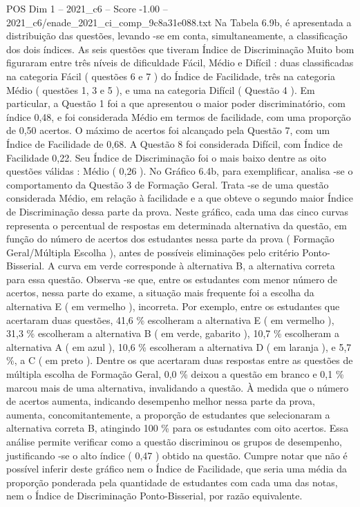 \begin{textsample}{POS Dim 1 – 2021\_c6 – Score -1.00 – 2021\_c6/enade\_2021\_ci\_comp\_9c8a31e088.txt}
Na Tabela 6.9b, é apresentada a distribuição das questões, levando -se em conta, simultaneamente, a classificação dos dois índices.
As seis questões que tiveram Índice de Discriminação Muito bom figuraram entre três níveis de dificuldade Fácil, Médio e Difícil : duas classificadas na categoria Fácil ( questões 6 e 7 ) do Índice de Facilidade, três na categoria Médio ( questões 1, 3 e 5 ), e uma na categoria Difícil ( Questão 4 ).
Em particular, a Questão 1 foi a que apresentou o maior poder discriminatório, com índice 0,48, e foi considerada Médio em termos de facilidade, com uma proporção de 0,50 acertos.
O máximo de acertos foi alcançado pela Questão 7, com um Índice de Facilidade de 0,68.
A Questão 8 foi considerada Difícil, com Índice de Facilidade 0,22.
Seu Índice de Discriminação foi o mais baixo dentre as oito questões válidas : Médio ( 0,26 ).
No Gráfico 6.4b, para exemplificar, analisa -se o comportamento da Questão 3 de Formação Geral.
Trata -se de uma questão considerada Médio, em relação à facilidade e a que obteve o segundo maior Índice de Discriminação dessa parte da prova.
Neste gráfico, cada uma das cinco curvas representa o percentual de respostas em determinada alternativa da questão, em função do número de acertos dos estudantes nessa parte da prova ( Formação Geral/Múltipla Escolha ), antes de possíveis eliminações pelo critério Ponto-Bisserial.
A curva em verde corresponde à alternativa B, a alternativa correta para essa questão.
Observa -se que, entre os estudantes com menor número de acertos, nessa parte do exame, a situação mais frequente foi a escolha da alternativa E ( em vermelho ), incorreta.
Por exemplo, entre os estudantes que acertaram duas questões, 41,6 \% escolheram a alternativa E ( em vermelho ), 31,3 \% escolheram a alternativa B ( em verde, gabarito ), 10,7 \% escolheram a alternativa A ( em azul ), 10,6 \% escolheram a alternativa D ( em laranja ), e 5,7 \%, a C ( em preto ).
Dentre os que acertaram duas respostas entre as questões de múltipla escolha de Formação Geral, 0,0 \% deixou a questão em branco e 0,1 \% marcou mais de uma alternativa, invalidando a questão.
À medida que o número de acertos aumenta, indicando desempenho melhor nessa parte da prova, aumenta, concomitantemente, a proporção de estudantes que selecionaram a alternativa correta B, atingindo 100 \% para os estudantes com oito acertos.
Essa análise permite verificar como a questão discriminou os grupos de desempenho, justificando -se o alto índice ( 0,47 ) obtido na questão.
Cumpre notar que não é possível inferir deste gráfico nem o Índice de Facilidade, que seria uma média da proporção ponderada pela quantidade de estudantes com cada uma das notas, nem o Índice de Discriminação Ponto-Bisserial, por razão equivalente.

\end{textsample}
